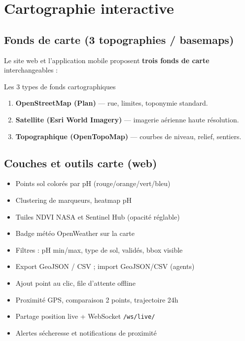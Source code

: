 \documentclass[11pt,a4paper]{report}
\begin{document}
\chapter{Cartographie interactive}

\section{Fonds de carte (3 topographies / basemaps)}
Le site web et l'application mobile proposent \textbf{trois fonds de carte} interchangeables :

\begin{infobox}{Les 3 types de fonds cartographiques}
\begin{enumerate}
  \item \textbf{OpenStreetMap (Plan)} — rue, limites, toponymie standard.
  \item \textbf{Satellite (Esri World Imagery)} — imagerie aérienne haute résolution.
  \item \textbf{Topographique (OpenTopoMap)} — courbes de niveau, relief, sentiers.
\end{enumerate}
\end{infobox}

\section{Couches et outils carte (web)}
\begin{itemize}[leftmargin=*]
  \item Points sol colorés par pH (rouge/orange/vert/bleu)
  \item Clustering de marqueurs, heatmap pH
  \item Tuiles NDVI NASA et Sentinel Hub (opacité réglable)
  \item Badge météo OpenWeather sur la carte
  \item Filtres : pH min/max, type de sol, validés, bbox visible
  \item Export GeoJSON / CSV ; import GeoJSON/CSV (agents)
  \item Ajout point au clic, file d'attente offline
  \item Proximité GPS, comparaison 2 points, trajectoire 24h
  \item Partage position live + WebSocket \texttt{/ws/live/}
  \item Alertes sécheresse et notifications de proximité
\end{itemize}
\end{document}
